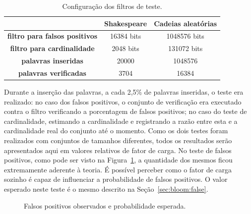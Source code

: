 \begin{table}[!htbp]
\begin{center}
	\begin{tabular}{ c | c | c }
		\hline 
		& {\bf Shakespeare} & {\bf Cadeias aleatórias} \\
		\hline 
		{\bf filtro para falsos positivos} & 16384 bits & 1048576 bits \\
		{\bf filtro para cardinalidade} & 2048 bits & 131072 bits \\
		{\bf palavras inseridas} & 20000 & 1048576 \\
		{\bf palavras verificadas} & 3704 & 16384 \\
		\hline 
	\end{tabular}
	\caption{Configuração dos filtros de teste.}
	\label{table:bloom_test_setup}
\end{center}
\end{table}

Durante a inserção das palavras, a cada 2,5\% de palavras inseridas, o teste era realizado: no caso dos falsos positivos, o conjunto de verificação era executado contra o filtro verificando a porcentagem de falsos positivos; no caso do teste de cardinalidade, estimando a cardinalidade e registrando a razão entre esta e a cardinalidade real do conjunto até o momento. Como os dois testes foram realizados com conjuntos de tamanhos diferentes, todos os resultados serão apresentados aqui em valores relativos de fator de carga. No teste de falsos positivos, como pode ser visto na Figura~\ref{fig:bloom_test_falsep}, a quantidade dos mesmos ficou extremamente aderente à teoria. É possível perceber como o fator de carga sozinho é capaz de influenciar a probabilidade de falsos positivos. O valor esperado neste teste é o mesmo descrito na Seção~\ref{sec:bloom:false}.

\begin{figure}[!htbp]
\centering
{}
\caption{Falsos positivos observados e probabilidade esperada.}
\label{fig:bloom_test_falsep}
\end{figure}

